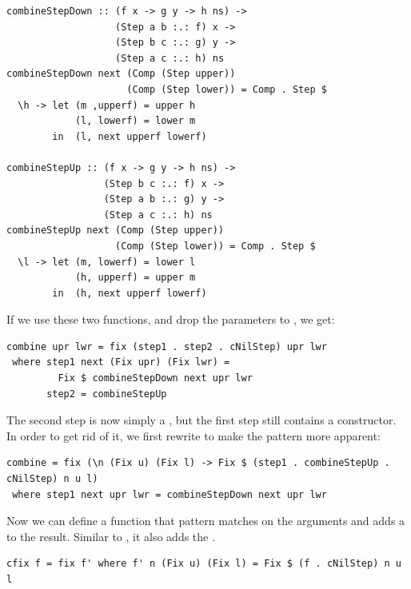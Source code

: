 \documentclass{llncs}
\begin{document}
\begin{small} 
\begin{verbatim}
combineStepDown :: (f x -> g y -> h ns) -> 
                   (Step a b :.: f) x -> 
                   (Step b c :.: g) y -> 
                   (Step a c :.: h) ns
combineStepDown next (Comp (Step upper)) 
                     (Comp (Step lower)) = Comp . Step $
  \h -> let (m ,upperf) = upper h
            (l, lowerf) = lower m
        in  (l, next upperf lowerf)   

combineStepUp :: (f x -> g y -> h ns) ->
                 (Step b c :.: f) x ->
                 (Step a b :.: g) y ->
                 (Step a c :.: h) ns
combineStepUp next (Comp (Step upper)) 
                   (Comp (Step lower)) = Comp . Step $ 
  \l -> let (m, lowerf) = lower l
            (h, upperf) = upper m
        in  (h, next upperf lowerf)   
\end{verbatim}%
\end{small}

If we use these two functions, and drop the parameters to , we get:

\begin{small}%
\begin{verbatim}
combine upr lwr = fix (step1 . step2 . cNilStep) upr lwr
 where step1 next (Fix upr) (Fix lwr) = 
         Fix $ combineStepDown next upr lwr
       step2 = combineStepUp
\end{verbatim}%
\end{small}

The second step is now simply a , but the first step still contains a  constructor. In order to get rid of it, we first rewrite  to make the pattern more apparent:

\begin{small}%
\begin{verbatim}
combine = fix (\n (Fix u) (Fix l) -> Fix $ (step1 . combineStepUp . cNilStep) n u l) 
 where step1 next upr lwr = combineStepDown next upr lwr
\end{verbatim}
\end{small}%

Now we can define a function  that pattern matches on the arguments and adds a  to the result. Similar to , it also adds the .

\begin{small}
\begin{verbatim}
cfix f = fix f' where f' n (Fix u) (Fix l) = Fix $ (f . cNilStep) n u l
\end{verbatim}%
\end{small}
\end{document}
